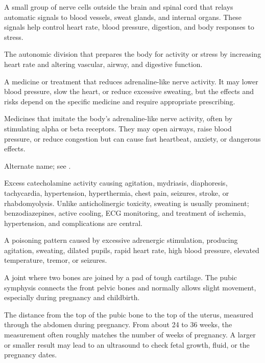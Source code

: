  A small group of nerve cells outside the brain and spinal cord that relays automatic signals to blood vessels, sweat glands, and internal organs. These signals help control heart rate, blood pressure, digestion, and body responses to stress.

 The autonomic division that prepares the body for activity or stress by increasing heart rate and altering vascular, airway, and digestive function.

 A medicine or treatment that reduces adrenaline-like nerve activity. It may lower blood pressure, slow the heart, or reduce excessive sweating, but the effects and risks depend on the specific medicine and require appropriate prescribing.

 Medicines that imitate the body's adrenaline-like nerve activity, often by stimulating alpha or beta receptors. They may open airways, raise blood pressure, or reduce congestion but can cause fast heartbeat, anxiety, or dangerous effects.

 Alternate name; see .

 Excess catecholamine activity causing agitation, mydriasis, diaphoresis, tachycardia, hypertension, hyperthermia, chest pain, seizures, stroke, or rhabdomyolysis. Unlike anticholinergic toxicity, sweating is usually prominent; benzodiazepines, active cooling, ECG monitoring, and treatment of ischemia, hypertension, and complications are central.

 A poisoning pattern caused by excessive adrenergic stimulation, producing agitation, sweating, dilated pupils, rapid heart rate, high blood pressure, elevated temperature, tremor, or seizures.

 A joint where two bones are joined by a pad of tough cartilage. The pubic symphysis connects the front pelvic bones and normally allows slight movement, especially during pregnancy and childbirth.

 The distance from the top of the pubic bone to the top of the uterus, measured through the abdomen during pregnancy. From about 24 to 36 weeks, the measurement often roughly matches the number of weeks of pregnancy. A larger or smaller result may lead to an ultrasound to check fetal growth, fluid, or the pregnancy dates.

